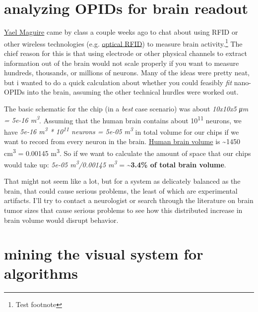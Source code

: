 

\section{analyzing OPIDs for brain readout} %
\label{sub:analyzing_opids_for_brain_readout}

	\href{http://web.media.mit.edu/~yael/}{Yael Maguire} came by class a couple weeks ago to chat about using RFID or other wireless technologies (e.g. \href{http://en.wikipedia.org/wiki/Optical\_RFID}{optical RFID})
	to measure brain activity.\footnote{Test footnote} The chief reason for this is that using electrode or other physical channels to extract information out of the brain would not scale properly if you want to measure hundreds,
	thousands, or millions of neurons. Many of the ideas were pretty neat,
	but i wanted to do a quick calculation about whether you could feasibly \emph{fit} nano-OPIDs into the brain, assuming the other technical hurdles were worked out.

	The basic schematic for the chip (in a \emph{best} case scenario) was about \emph{10x10x5 μm = 5e-16 m\textsuperscript{3}}. Assuming that the human brain contains about 10\textsuperscript{11} neurons, we have \emph{5e-16 m\textsuperscript{3} * 10\textsuperscript{11} neurons =
	5e-05 m\textsuperscript{3}} in total volume for our chips if we want to record from every neuron in the brain.
	\href{http://hypertextbook.com/facts/2001/ViktoriyaShchupak.shtml}{Human brain volume} is \textasciitilde{}1450 cm\textsuperscript{3} = 0.00145 m\textsuperscript{3}. So if we want to calculate the amount of space that our chips would take up: \emph{5e-05 m\textsuperscript{3}/0.00145 m\textsuperscript{3}} = \textbf{\textasciitilde{}3.4\% of total brain volume}.

	That might not seem like a lot, but for a system as delicately balanced as the brain, that could cause serious problems, the least of which are experimental artifacts. I'll try to contact a neurologist or search through the literature on brain tumor sizes that cause serious problems to see how this distributed increase in brain volume would disrupt behavior.


	\section{mining the visual system for algorithms}


